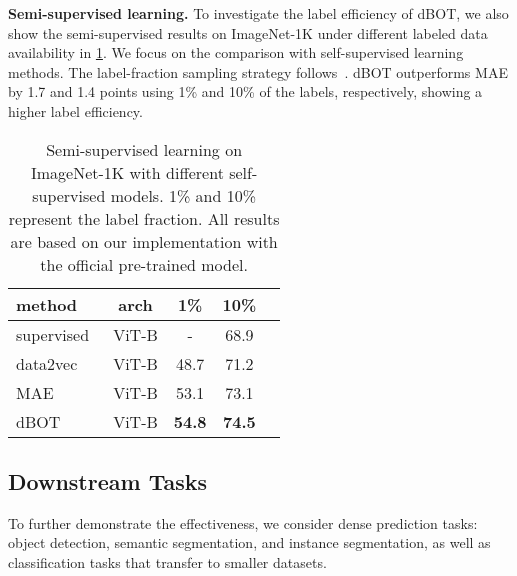 \documentclass[10pt,twocolumn,letterpaper]{article}
\renewcommand{\paragraph}[1]{\vspace{1.25mm}\noindent\textbf{#1}}
\def\ourmethod{{dBOT}\xspace}
\begin{document}
\paragraph{Semi-supervised learning.}
To investigate the label efficiency of \ourmethod, we also show the semi-supervised results on ImageNet-1K under different labeled data availability in \cref{tab:semi-supervised}.
We focus on the comparison with self-supervised learning methods. 
The label-fraction sampling strategy follows~\cite{simclr}. 
\ourmethod outperforms MAE by 1.7 and 1.4 points using 1\% and 10\% of the labels, respectively, showing a higher label efficiency.

\begin{table}[t]
    \begin{center}
    \setlength{\tabcolsep}{5mm}
    \begin{tabular}{l|c|ccc}
        method & arch & 1\% & 10\% \\
        \hline
        \textcolor{gray!80}{supervised~\cite{semi-vit}} & ViT-B&\textcolor{gray!80}{-}&\textcolor{gray!80}{68.9}\\
        data2vec~\cite{baevski2022data2vec} & ViT-B&48.7& 71.2\\
        MAE~\cite{mae} & ViT-B & 53.1 & 73.1\\
        \hline
        \ourmethod & ViT-B & \textbf{54.8} & \textbf{74.5}\\ 
    \end{tabular}
    \end{center}
    \caption{Semi-supervised learning on ImageNet-1K with different self-supervised models.
    1\% and 10\% represent the label fraction.
    All results are based on our implementation with the official pre-trained model.}
    \label{tab:semi-supervised}
\vspace{-0.2cm}
\end{table}


\subsection{Downstream Tasks}
\label{sec:exp-downstream}
To further demonstrate the effectiveness, we consider dense prediction tasks: object detection, semantic segmentation, and instance segmentation, as well as classification tasks that transfer to smaller datasets.
\end{document}

